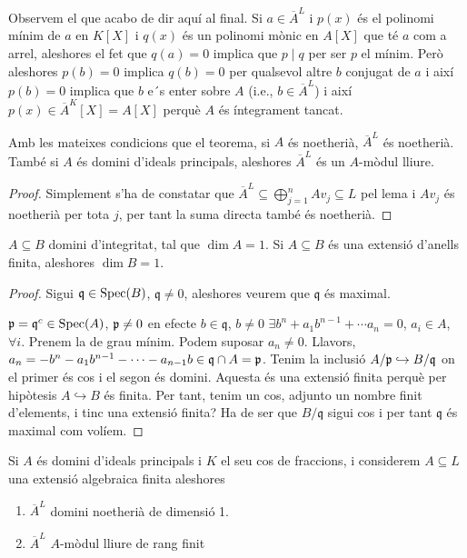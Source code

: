 \documentclass[../../../main.tex]{subfiles}
\begin{document}
Observem el que acabo de dir aquí al final. Si $a\in\overline{A}^L$ i $p(x)$ és el polinomi mínim de $a$ en $K[X]$ i $q(x)$ és un polinomi mònic en $A[X]$ que té $a$ com a arrel, aleshores el fet que $q(a) = 0$ implica que $p\mid q$ per ser $p$ el mínim. Però aleshores $p(b) = 0$ implica $q(b) = 0$ per qualsevol altre $b$ conjugat de $a$ i així $p(b) = 0$ implica que $b$ e´s enter sobre $A$ (i.e., $b\in\overline{A}^L$) i així $p(x)\in \overline{A}^K[X] = A[X]$ perquè $A$ és íntegrament tancat.


\begin{coro}
Amb les mateixes condicions que el teorema, si $A$ és noetherià, $\overline{A}^L$ és noetherià. També si $A$ és domini d'ideals principals, aleshores $\overline{A}^L$ és un $A$-mòdul lliure.
\end{coro}
\begin{proof}
Simplement s'ha de constatar que $\overline{A}^L\subseteq \bigoplus_{j=1}^n Av_j\subseteq L$ pel lema i $Av_j$ és noetherià per tota $j$, per tant la suma directa també és noetherià. 
\end{proof}

\begin{lema}
$A\subseteq B$ domini d'integritat, tal que $\dim A = 1$. Si $A\subseteq B$ és una extensió d'anells finita, aleshores $\dim B = 1$.
\end{lema}
\begin{proof}
Sigui $\mathfrak{q}\in\mathrm{Spec}(B)$, $\mathfrak{q}\neq 0$, aleshores veurem que $\mathfrak{q}$ és maximal.

$\mathfrak{p}=\mathfrak{q}^c\in\mathrm{Spec}(A)$, $\mathfrak{p}\not=0$ en efecte $b\in\mathfrak{q}$, $b\neq0$ $\exists b^n+a_1b^{n-1}+\cdots a_n = 0$, $a_i\in A$, $\forall i$. Prenem la de grau mínim. Podem suposar $a_n\neq 0$. Llavors, $a_n = -b^n-a_1b^{n-1}-\cdots-a_{n-1}b\in\mathfrak{q}\cap A = \mathfrak{p}$. Tenim la inclusió $A/\mathfrak{p}\hookrightarrow B/\mathfrak{q}$ on el primer és cos i el segon és domini. Aquesta és una extensió finita perquè per hipòtesis $A\hookrightarrow B$ és finita. Per tant, tenim un cos, adjunto un nombre finit d'elements, i tinc una extensió finita? Ha de ser que $B/\mathfrak{q}$ sigui cos i per tant $\mathfrak{q}$ és maximal com volíem.
\end{proof}

\begin{coro}
Si $A$ és domini d'ideals principals i $K$ el seu cos de fraccions, i considerem $A\subseteq L$ una extensió algebraica finita aleshores
\begin{enumerate}[(1)]
    \item $\overline{A}^L$ domini noetherià de dimensió 1.
    \item $\overline{A}^L$ $A$-mòdul lliure de rang finit
\end{enumerate}
\end{coro}
\end{document}
